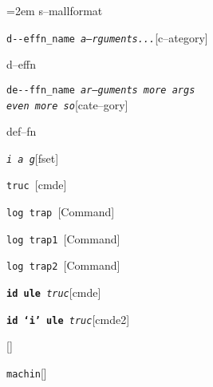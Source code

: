 \documentclass{book}
\begin{document}
\par\begingroup\obeylines\obeyspaces\frenchspacing\leftskip=2em\relax\parskip=0pt\relax\footnotesize{}%
s--mallformat
\endgroup{}%

\noindent\texttt{d{-}{-}effn\_name \bgroup{}\normalfont{}\textsl{a--rguments...}\egroup{}}\hfill[c--ategory]



%
d--effn

\noindent\texttt{de{-}{-}ffn\_name \bgroup{}\normalfont{}\textsl{ar--guments    more args \leavevmode{}\\ even more so}\egroup{}}\hfill[cate--gory]



%
def--fn

\noindent\texttt{\textsl{i} \bgroup{}\normalfont{}\textsl{a g}\egroup{}}\hfill[fset]



%
%
\noindent\texttt{truc \bgroup{}\normalfont{}\textsl{}\egroup{}}\hfill[cmde]



%
\noindent\texttt{log trap \bgroup{}\normalfont{}\textsl{}\egroup{}}\hfill[Command]



%
\noindent\texttt{log trap1 \bgroup{}\normalfont{}\textsl{}\egroup{}}\hfill[Command]



%
\noindent\texttt{log trap2 \bgroup{}\normalfont{}\textsl{}\egroup{}}\hfill[Command]



%
\noindent\texttt{\textbf{id ule} \bgroup{}\normalfont{}\textsl{truc}\egroup{}}\hfill[cmde]



%
\noindent\texttt{\textbf{id `\texttt{i}' ule} \bgroup{}\normalfont{}\textsl{truc}\egroup{}}\hfill[cmde2]



%
\noindent\texttt{}\hfill[]



\noindent\texttt{machin}\hfill[]
\end{document}
